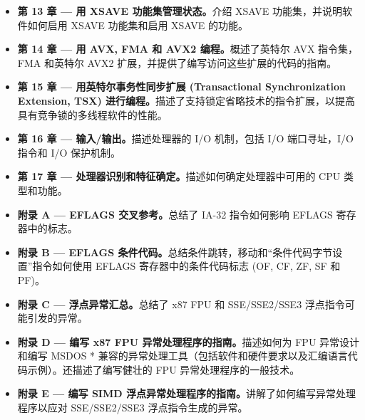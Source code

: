 \begin{itemize}
	\item \textbf{第 13 章 — 用 XSAVE 功能集管理状态。}介绍 XSAVE 功能集，并说明软件如何启用 XSAVE 功能集和启用 XSAVE 的功能。
	\item \textbf{第 14 章 — 用 AVX, FMA 和 AVX2 编程。}概述了英特尔 AVX 指令集，FMA 和英特尔 AVX2 扩展，并提供了编写访问这些扩展的代码的指南。
	\item \textbf{第 15 章 — 用英特尔事务性同步扩展 (Transactional Synchronization Extension, TSX) 进行编程。}描述了支持锁定省略技术的指令扩展，以提高具有竞争锁的多线程软件的性能。
	\item \textbf{第 16 章 — 输入/输出。}描述处理器的 I/O 机制，包括 I/O 端口寻址，I/O 指令和 I/O 保护机制。
	\item \textbf{第 17 章 — 处理器识别和特征确定。}描述如何确定处理器中可用的 CPU 类型和功能。
	\item \textbf{附录 A — EFLAGS 交叉参考。}总结了 IA-32 指令如何影响 EFLAGS 寄存器中的标志。
	\item \textbf{附录 B — EFLAGS 条件代码。}总结条件跳转，移动和“条件代码字节设置”指令如何使用 EFLAGS 寄存器中的条件代码标志 (OF, CF, ZF, SF 和 PF)。
	\item \textbf{附录 C — 浮点异常汇总。}总结了 x87 FPU 和 SSE/SSE2/SSE3 浮点指令可能引发的异常。
	\item \textbf{附录 D — 编写 x87 FPU 异常处理程序的指南。}描述如何为 FPU 异常设计和编写 MSDOS * 兼容的异常处理工具（包括软件和硬件要求以及汇编语言代码示例）。还描述了编写健壮的 FPU 异常处理程序的一般技术。
	\item \textbf{附录 E — 编写 SIMD 浮点异常处理程序的指南。}讲解了如何编写异常处理程序以应对 SSE/SSE2/SSE3 浮点指令生成的异常。
\end{itemize}